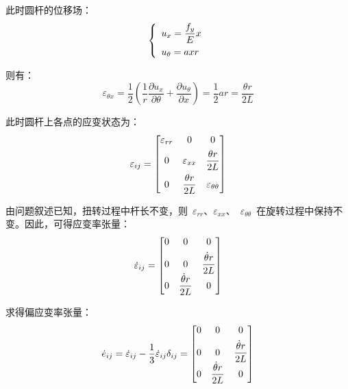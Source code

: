 此时圆杆的位移场：
\begin{equation}\label{eq9}
    \left\{
        \begin{array}{l}
            u_x = \dfrac{f_y}{E}x \vspace{1ex}\\
            u_\theta = axr\\
        \end{array}
    \right.
\end{equation} 

则有：
\begin{equation}\label{eq10}
    \varepsilon_{\theta x} =\dfrac{1}{2}(\dfrac{1}{r}\dfrac{\partial u_x}{\partial \theta}+\dfrac{\partial u_\theta}{\partial x})=\dfrac{1}{2}ar=\dfrac{\theta r}{2L}
\end{equation} 

此时圆杆上各点的应变状态为：
\begin{equation}\label{eq11}
    \varepsilon_{ij} = \begin{bmatrix}
        \varepsilon_{rr} & 0 & 0 \vspace{1ex}\\
        0 & \varepsilon_{xx} & \dfrac{\theta r}{2L} \vspace{1ex}\\
        0 & \dfrac{\theta r}{2L} & \varepsilon_{\theta \theta}
        \end{bmatrix}
\end{equation} 

由问题叙述已知，扭转过程中杆长不变，则~{$\varepsilon_{rr}$}、{$\varepsilon_{xx}$}、~{$\varepsilon_{\theta \theta}$}~在旋转过程中保持不变。因此，可得应变率张量：
\begin{equation}\label{eq12}
    \dot \varepsilon_{ij} = \begin{bmatrix}
        0 & 0 & 0 \vspace{1ex}\\
        0 & 0 & \dfrac{\dot\theta r}{2L}\\
        0 & \dfrac{\dot\theta r}{2L} & 0
    \end{bmatrix}
\end{equation} 

求得偏应变率张量：
\begin{equation}\label{eq13}
    \dot e_{ij} = \dot \varepsilon_{ij} - \dfrac{1}{3}\dot \varepsilon_{ij} \delta_{ij}  = \begin{bmatrix}
        0 & 0 & 0 \vspace{1ex}\\
        0 & 0 & \dfrac{\dot\theta r}{2L}\\
        0 & \dfrac{\dot\theta r}{2L} & 0
        \end{bmatrix}
\end{equation} 

